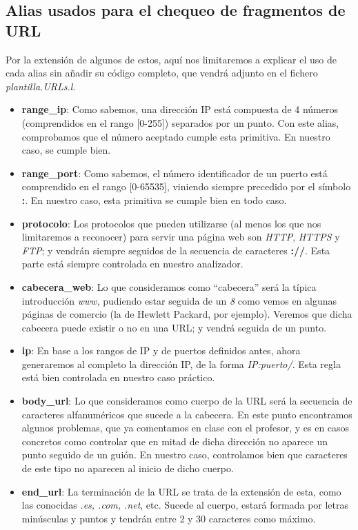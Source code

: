 \documentclass[]{scrartcl}
\begin{document}
  \subsection{Alias usados para el chequeo de fragmentos de URL}
  Por la extensión de algunos de estos, aquí nos limitaremos a explicar el uso de cada alias sin añadir su código completo, que vendrá adjunto en el fichero \emph{plantilla.URLs.l}.
  \begin{itemize}
  	\item \textbf{range\_ip}: Como sabemos, una dirección IP está compuesta de 4 números (comprendidos en el rango [0-255]) separados por un punto. Con este alias, comprobamos que el número aceptado cumple esta primitiva. En nuestro caso, se cumple bien.
  	\item \textbf{range\_port}: Como sabemos, el número identificador de un puerto está comprendido en el rango [0-65535], viniendo siempre precedido por el símbolo \textbf{:}. En nuestro caso, esta primitiva se cumple bien en todo caso.
  	\item \textbf{protocolo}: Los protocolos que pueden utilizarse (al menos los que nos limitaremos a reconocer) para servir una página web son \emph{HTTP}, \emph{HTTPS} y \emph{FTP}; y vendrán siempre seguidos de la secuencia de caracteres \textbf{://}. Esta parte está siempre controlada en nuestro analizador.
  	\item \textbf{cabecera\_web}: Lo que consideramos como ``cabecera'' será la típica introducción \emph{www}, pudiendo estar seguida de un \emph{8} como vemos en algunas páginas de comercio (la de Hewlett Packard, por ejemplo). Veremos que dicha cabecera puede existir o no en una URL; y vendrá seguida de un punto.
  	\item \textbf{ip}: En base a los rangos de IP y de puertos definidos antes, ahora generaremos al completo la dirección IP, de la forma \emph{IP:puerto/}. Esta regla está bien controlada en nuestro caso práctico.
  	\item \textbf{body\_url}: Lo que consideramos como cuerpo de la URL será la secuencia de caracteres alfanuméricos que sucede a la cabecera. En este punto encontramos algunos problemas, que ya comentamos en clase con el profesor, y es en casos concretos como controlar que en mitad de dicha dirección no aparece un punto seguido de un guión. En nuestro caso, controlamos bien que caracteres de este tipo no aparecen al inicio de dicho cuerpo.
  	\item \textbf{end\_url}: La terminación de la URL se trata de la extensión de esta, como las conocidas \emph{.es, .com, .net}, etc. Sucede al cuerpo, estará formada por letras minúsculas y puntos y tendrán entre 2 y 30 caracteres como máximo.

\end{itemize}
\end{document}
